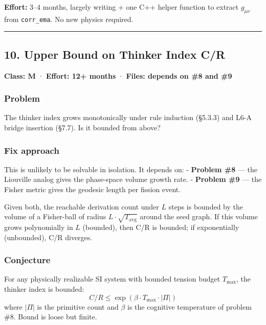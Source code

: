 \documentclass[
  11pt,
  a4paper,
]{article}
\begin{document}
\textbf{Effort:} 3--4 months, largely writing + one C++ helper function
to extract \(g_{\mu\nu}\) from \texttt{corr\_ema}. No new physics
required.

\begin{center}\rule{0.5\linewidth}{0.5pt}\end{center}

\subsection{10. Upper Bound on Thinker Index
C/R}\label{upper-bound-on-thinker-index-cr}

\textbf{Class: M} · \textbf{Effort: 12+ months} · \textbf{Files: depends
on \#8 and \#9}

\subsubsection{Problem}\label{problem-9}

The thinker index grows monotonically under rule induction (§5.3.3) and
L6-A bridge insertion (§7.7). Is it bounded from above?

\subsubsection{Fix approach}\label{fix-approach-2}

This is unlikely to be solvable in isolation. It depends on: -
\textbf{Problem \#8} --- the Liouville analog gives the phase-space
volume growth rate. - \textbf{Problem \#9} --- the Fisher metric gives
the geodesic length per fission event.

Given both, the reachable derivation count under \(L\) steps is bounded
by the volume of a Fisher-ball of radius \(L \cdot \sqrt{T_\text{avg}}\)
around the seed graph. If this volume grows polynomially in \(L\)
(bounded), then C/R is bounded; if exponentially (unbounded), C/R
diverges.

\subsubsection{Conjecture}\label{conjecture}

For any physically realizable SI system with bounded tension budget
\(T_\text{max}\), the thinker index is bounded: \[
C/R \leq \exp(\beta \cdot T_\text{max} \cdot |\Pi|)
\] where \(|\Pi|\) is the primitive count and \(\beta\) is the cognitive
temperature of problem \#8. Bound is loose but finite.
\end{document}

